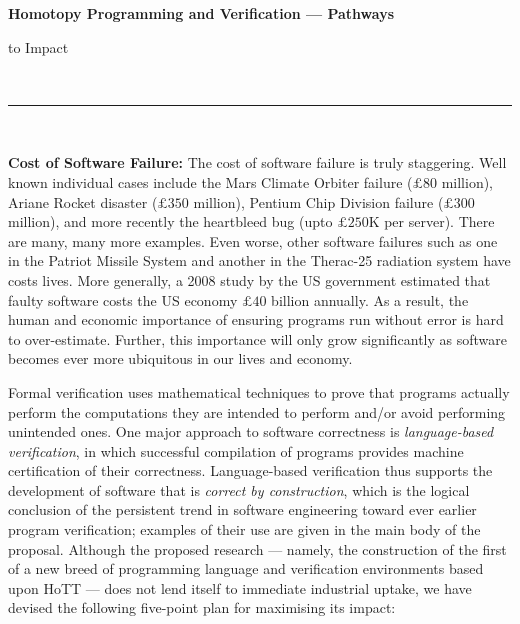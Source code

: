 \documentclass[a4paper,11pt]{article}
\begin{document}
\thispagestyle{plain}

\begin{center}

  {\Large {\bf Homotopy Programming and Verification --- Pathways

      to Impact}}\\[1ex]   



\vspace*{-0.1in}



  \rule{150mm}{.5mm}\\[2ex]

\end{center}



\noindent



\vspace*{-0.1in}

{\bf Cost of Software Failure:} The cost of software failure is truly
staggering. Well known individual cases include the Mars Climate
Orbiter failure ($\pounds 80$ million), Ariane Rocket disaster
($\pounds 350$ million), Pentium Chip Division failure ($\pounds 300$
million), and more recently the heartbleed bug (upto $\pounds 250$K per
server). There are many, many more examples. Even worse, other
software failures such as one in the Patriot Missile System and
another in the Therac-25 radiation system have costs lives. More
generally, a 2008 study by the US government estimated that faulty
software costs the US economy $\pounds 40$ billion annually.  As a
result, the human and economic importance of ensuring programs run
without error is hard to over-estimate. Further, this importance will
only grow significantly as software becomes ever more ubiquitous in
our lives and economy.

Formal verification uses mathematical techniques to prove that
programs actually perform the computations they are intended to
perform and/or avoid performing unintended ones. One major approach to
software correctness is {\em language-based verification}, in which
successful compilation of programs provides machine certification of
their correctness. Language-based verification thus supports the
development of software that is {\em correct by construction}, which
is the logical conclusion of the persistent trend in software
engineering toward ever earlier program verification; examples of
their use are given in the main body of the proposal. Although the
proposed research --- namely, the construction of the first of a new
breed of programming language and verification environments based upon
HoTT --- does not lend itself to immediate industrial uptake, we have
devised the following five-point plan for maximising its impact:
\end{document}
